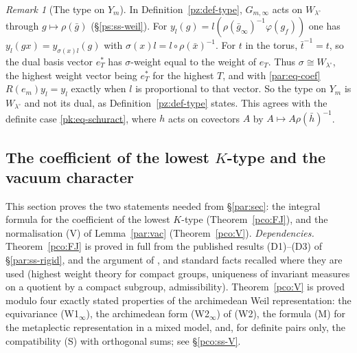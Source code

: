 \documentclass[10pt]{amsart}
\theoremstyle{definition}
\theoremstyle{remark}
\newtheorem{remark}[theorem]{Remark}
\providecommand{\auU}{\mathrm U}
\begin{document}
\begin{remark}[The type on $Y_m$]\label{par:Ym}
In Definition~\ref{pz:def-type}, $G_{m,\infty}$ acts on $W_{\lambda^\circ}$ through $g\mapsto\rho(\bar g)$
(\S\ref{ps:ss-weil}). For $y_l(g)=l(\rho(\bar g_\infty)^{-1}\varphi(g_f))$ one has $y_l(gx)=y_{\sigma(x)l}(g)$
with $\sigma(x)l=l\circ\rho(\bar x)^{-1}$. For $t$ in the torus, $\bar t^{-1}=t$, so the dual basis vector
$e_T^*$ has $\sigma$-weight equal to the weight of $e_T$. Thus $\sigma\cong W_{\lambda^\circ}$, the
highest weight vector being $e^*_{T}$ for the highest $T$, and with \eqref{par:eq-coef}
$R(e_m)y_l=y_l$ exactly when $l$ is proportional to that vector. So the type on $Y_m$ is
$W_{\lambda^\circ}$ and not its dual, as Definition~\ref{pz:def-type} states. This agrees with the
definite case \eqref{pk:eq-schuract}, where $h$ acts on covectors $A$ by $A\mapsto A\rho(\bar h)^{-1}$.
\end{remark}



\providecommand{\auU}{\mathrm U}
\providecommand{\auHom}{\operatorname{Hom}}
\providecommand{\pcom}{\mathsf m}
\providecommand{\pcoD}{\mathsf D}
\providecommand{\pcoH}{\mathsf H}
\providecommand{\pcoB}{\mathsf B}
\providecommand{\pcotr}{\operatorname{tr}}

\subsection{The coefficient of the lowest $K$-type and the vacuum character}\label{pco:sec}

This section proves the two statements needed from \S\ref{par:sec}: the integral formula
{\cite[(59)]{P51}} for the coefficient of the lowest $K$-type (Theorem~\ref{pco:FJ}), and the
normalisation (V) of Lemma~\ref{par:vac} (Theorem~\ref{pco:V}). \emph{Dependencies.}
Theorem~\ref{pco:FJ} is proved in full from the published results (D1)--(D3) of
\S\ref{par:ss-rigid}, {\cite[Lemmas~5.4 and~5.5]{P51}} and the argument of {\cite[Lemma~4.7(c)]{P51}},
and standard facts recalled where they are used (highest weight theory for compact groups,
uniqueness of invariant measures on a quotient by a compact subgroup, admissibility). Theorem~\ref{pco:V}
is proved modulo four exactly stated properties of the archimedean Weil representation:
the equivariance (W1$_\infty$), the archimedean form (W2$_\infty$) of (W2), the formula (M) for the metaplectic representation
in a mixed model, and, for definite pairs only, the compatibility (S) with orthogonal sums;
see \S\ref{pco:ss-V}.
\end{document}
